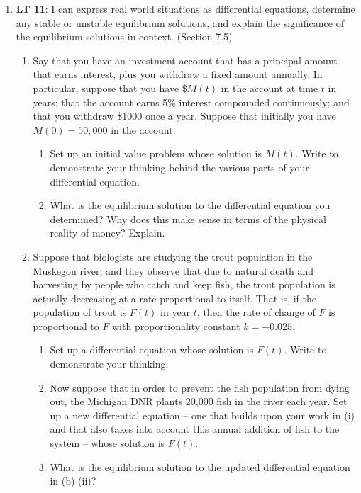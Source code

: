 \documentclass[11 pt]{article}
\newcommand{\be}{\begin{enumerate}}
\newcommand{\ee}{\end{enumerate}}
\begin{document}
\begin{enumerate}


\item[11.] {\bf LT 11}:  I can express real world situations as differential equations, determine any stable or unstable equilibrium solutions, and explain the significance of the equilibrium solutions in context. (Section 7.5)

\be
	\item Say that you have an investment account that has a principal amount that earns interest, plus you withdraw a fixed amount annually.  In particular, suppose that you have \$$M(t)$  in the account at time $t$ in years; that the account earns 5\% interest compounded continuously; and that you withdraw \$1000  once a year.  Suppose that initially you have $M(0) = 50,000$ in the account.
	
	\be
		\item Set up an initial value problem whose solution is $M(t)$.  Write to demonstrate your thinking behind the various parts of your differential equation.
		
		\item What is the equilibrium solution to the differential equation you determined?  Why does this make sense in terms of the physical reality of money?  Explain.
		
	\ee
	
	
	\item Suppose that biologists are studying the trout population in the Muskegon river, and they observe that due to natural death and harvesting by people who catch and keep fish, the trout population is actually decreasing at a rate proportional to itself.  That is, if the population of trout is $F(t)$ in year $t$, then the rate of change of $F$ is proportional to $F$ with proportionality constant $k = -0.025$.  
	
	\be
		\item Set up a differential equation whose solution is $F(t)$.  Write to demonstrate your thinking.
		
		\item Now suppose that in order to prevent the fish population from dying out, the Michigan DNR plants 20,000 fish in the river each year.  Set up a new differential equation -- one that builds upon your work in (i) and that also takes into account this annual addition of fish to the system -- whose solution is $F(t)$.
		
		\item What is the equilibrium solution to the updated differential equation in (b)-(ii)?
	\ee
	
	
\ee


	\end{enumerate}
	
\end{document}

